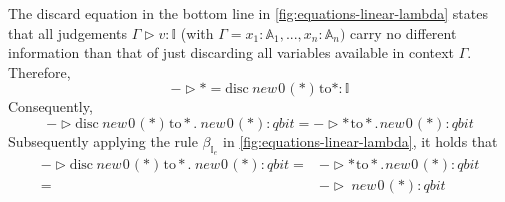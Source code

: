 The discard equation in  the bottom line  in \autoref{fig:equations-linear-lambda} states that all judgements $\Gamma \triangleright v : \mathbb{I}$ (with $\Gamma = x_{1} : \mathbb{A}_1, . . . , x_{n} : \mathbb{A}_n)$ carry no different information than that of just discarding all variables available in context $\Gamma$. Therefore, 
\begin{equation}
  -  \triangleright * =  \text{disc} \hspace{3pt} \textit{new}\hspace{1pt}0 \hspace{1pt}(*) \hspace{1pt} \text{to} * : \mathbb{I}
\end{equation}
Consequently,
\begin{equation}
 - \triangleright \text{disc} \hspace{3pt} \textit{new}\hspace{1pt}0 \hspace{1pt}(*) \hspace{1pt} \text{to} *. \hspace{3pt} \textit{new}\hspace{1pt}0 \hspace{1pt}(*): \textit{qbit} = - \triangleright * \hspace{1pt} \text{to} *. \hspace{1pt} \textit{new}\hspace{1pt}0 \hspace{1pt}(*): \textit{qbit}
\end{equation}
Subsequently applying the rule  $\beta_{\mathbb{I}_{e}}$ in \autoref{fig:equations-linear-lambda}, it holds that
\begin{equation}
  \begin{split}
    - \triangleright \text{disc} \hspace{3pt} \textit{new}\hspace{1pt}0 \hspace{1pt}(*) \hspace{1pt} \text{to} *. \hspace{3pt} \textit{new}\hspace{1pt}0 \hspace{1pt}(*): \textit{qbit}  =& - \triangleright * \hspace{1pt} \text{to} *. \hspace{1pt}\textit{new}\hspace{1pt}0 \hspace{1pt}(*): \textit{qbit}\\
  = &  - \triangleright \hspace{3pt} \textit{new}\hspace{1pt}0 \hspace{1pt}(*): \textit{qbit}
\end{split}
\end{equation}



